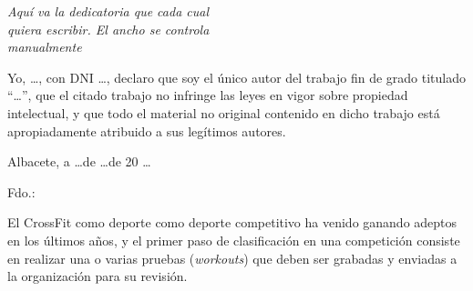 %
% 



\thispagestyle{empty}

\vspace*{9cm}  
\begin{flushright} \em 
Aquí va la dedicatoria que cada cual \\ 
quiera escribir. El ancho se controla \\ 
manualmente
\end{flushright}


\clearpage
\thispagestyle{plain}
\setcounter{page}{1} \null
\begin{center}
\Large{}
\end{center}
\vskip1cm

Yo, \quad \ldots \quad, con DNI \quad \ldots \quad, declaro que soy el único autor del trabajo fin de grado titulado ``\quad \ldots \quad'', que el citado trabajo no infringe las leyes en vigor sobre propiedad intelectual, y que todo el material no original contenido en dicho trabajo está apropiadamente atribuido a sus legítimos autores.

\vspace*{2cm}
\begin{center}
Albacete, a \quad \ldots \quad de \quad \ldots \quad de 20 \ldots

\vskip3cm

Fdo.: \autor
\end{center}


\clearpage
\thispagestyle{plain}
\begin{center}
\Large{}
\end{center}
\vskip1cm

El CrossFit como deporte como deporte competitivo ha venido ganando adeptos en los últimos años, y el primer paso de clasificación en una competición consiste en realizar una o varias pruebas (\textit{workouts}) que deben ser grabadas y enviadas a la organización para su revisión.

